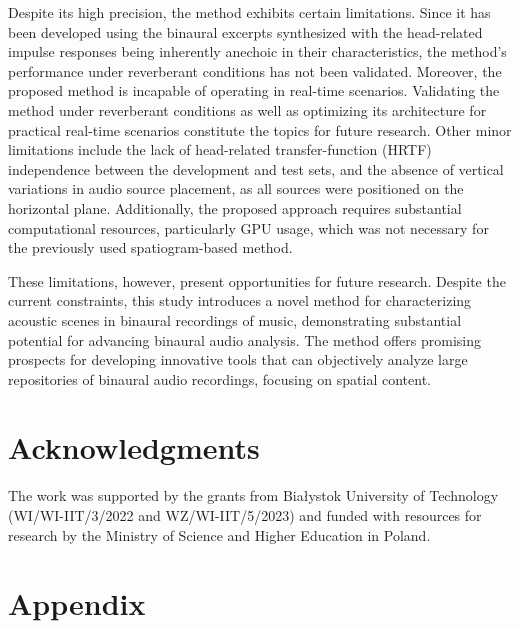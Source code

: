 \documentclass[11pt]{article}
\begin{document}
Despite its high precision, the method exhibits certain limitations. Since it has been developed using the binaural excerpts synthesized with the head-related impulse responses being inherently anechoic in their characteristics, the method's performance under reverberant conditions has not been validated. Moreover, the proposed method is incapable of operating in real-time scenarios. Validating the method under reverberant conditions as well as optimizing its architecture for practical real-time scenarios constitute the topics for future research. Other minor limitations include the lack of head-related transfer-function (HRTF) independence between the development and test sets, and the absence of vertical variations in audio source placement, as all sources were positioned on the horizontal plane. Additionally, the proposed approach requires substantial computational resources, particularly GPU usage, which was not necessary for the previously used spatiogram-based method.

These limitations, however, present opportunities for future research. Despite the current constraints, this study introduces a novel method for characterizing acoustic scenes in binaural recordings of music, demonstrating substantial potential for advancing binaural audio analysis. The method offers promising prospects for developing innovative tools that can objectively analyze large repositories of binaural audio recordings, focusing on spatial content.

\section*{Acknowledgments}
The work was supported by the grants from Białystok University of Technology (WI/WI-IIT/3/2022 and WZ/WI-IIT/5/2023) and funded with resources for research by the Ministry of Science and Higher Education in Poland.

\section*{Appendix}
\label{appendix:a_hrtf}
\end{document}
